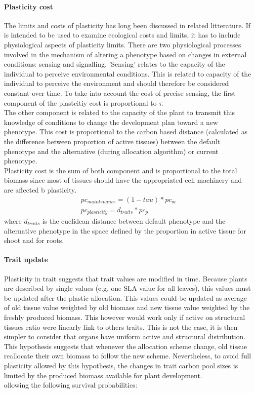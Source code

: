 \paragraph{Plasticity cost}
The limits and costs of plasticity has long been discussed in related litterature. If \model is intended to be used to examine ecological costs and limits, it has to include physiological aspects of plasticity limits. There are two physiological processes involved in the mechanism of altering a phenotype based on changes in external conditions: sensing and signalling. 'Sensing' relates to the capacity of the individual to perceive environmental conditions. This is related to capacity of the individual to perceive the environment and should therefore be considered constant over time. To take into account the cost of precise sensing, the first component of the plastcitiy cost is proportional to $\tau$.\\
The other component is related to the capacity of the plant to transmit this knowledge of conditions to change the development plan toward a new phenotype. This cost is proportional to the carbon based distance (calculated as the difference between proportion of active tissues) between the default phenotype and the alternative (during allocation algorithm) or current phenotype.\\
Plasticity cost is the sum of both component and is proportional to the total biomass since most of tissues should have the appropriated cell machinery and are affected b plasticity.
\begin{align}
pc_{maintenance} = (1 - tau) * pc_m \\
pc_{plasticity} = d_{traits} * pc_p
\end{align}
where $d_{traits}$ is the euclidean distance between default phenotype and the alternative phenotype in the space defined by the proportion in active tissue for shoot and for roots.

\paragraph{Trait update}
Plasticity in trait suggests that trait values are modified in time. Because plants are described by single values (e.g. one SLA value for all leaves), this values must be updated after the plastic allocation. This values could be updated as average of old tissue value weighted by old biomass and new tissue value weighted by the freshly produced biomass. This however would work only if active on structural tissues ratio were linearly link to others traits. This is not the case, it is then simpler to consider that organs have uniform active and structural distribution. This hypothesis suggests that whenever the allocation scheme change, old tissue reallocate their own biomass to follow the new scheme. Nevertheless, to avoid full plasticity allowed by this hypothesis, the changes in trait carbon pool sizes is limited by the produced biomass available for plant development.\\ollowing the following survival probabilities:


